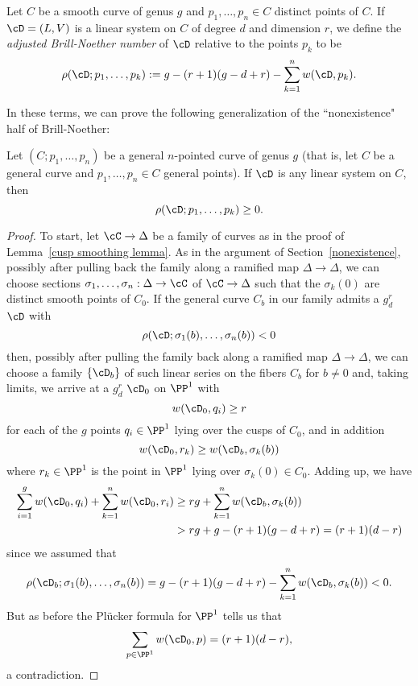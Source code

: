 \begin{definition}
Let $C$ be a smooth curve of genus $g$ and $p_1,\dots,p_n \in C$ distinct points of $C$. If $\cD = (L,V)$ is a linear system on $C$ of degree $d$ and dimension $r$, we define the \emph{adjusted Brill-Noether number} of $\cD$ relative to the points $p_k$ to be
$$
\rho(\cD; p_1,\dots,p_k) := g - (r+1)(g-d+r) - \sum_{k=1}^n w(\cD,p_k).
$$
\end{definition}

In these terms, we can prove the following generalization of the ``nonexistence" half of Brill-Noether:

\begin{theorem}\label{Brill-Noether with inflection}
Let $(C;p_1,\dots,p_n)$ be a general $n$-pointed curve of genus $g$ (that is, let $C$ be a general curve and $p_1,\dots,p_n \in C$ general points). If $\cD$ is any linear system on $C$, then
$$
\rho(\cD; p_1,\dots,p_k) \geq 0.
$$
\end{theorem}

\begin{proof}
To start, let $\cC \to \Delta$ be a family of curves as in the proof of Lemma~\ref{cusp smoothing lemma}.
As in the argument of Section~\ref{nonexistence}, possibly
after pulling back the family along a ramified map $\Delta \to \Delta$, we can choose sections $\sigma_1, \dots, \sigma_n : \Delta \to \cC$  of $\cC \to \Delta$ such that the $\sigma_k(0)$ are distinct smooth points of $C_0$.
If the general curve $C_b$ in our family admits a $g^r_d$ $\cD$ with
$$
\rho(\cD;\sigma_1(b),\dots,\sigma_n(b)) < 0
$$
then, possibly after pulling the family back along a ramified map $\Delta \to \Delta$, we can choose a family $\{\cD_b\}$ of such linear series 
on the fibers $C_b$ for $b \neq 0$ and, taking limits, we arrive at a $g^r_d$ $\cD_0$ on $\PP^1$ with
$$
w(\cD_0, q_i) \geq r
$$
for each of the $g$ points $q_i \in \PP^1$ lying over the cusps of $C_0$, and in addition
$$
w(\cD_0, r_k) \geq w(\cD_b,\sigma_k(b))
$$
where $r_k \in \PP^1$ is the point in $\PP^1$ lying over $\sigma_k(0) \in C_0$. Adding up, we have
\begin{align*}
\sum_{i=1}^g w(\cD_0, q_i) + \sum_{k=1}^n w(\cD_0, r_i) &\geq rg + \sum_{k=1}^n w(\cD_b,\sigma_k(b)) \\
&> rg + g - (r+1)(g-d+r) = (r+1)(d-r)
\end{align*}
since we assumed that 
$$
\rho(\cD_b;\sigma_1(b),\dots,\sigma_n(b)) = g - (r+1)(g-d+r) - \sum_{k=1}^n w(\cD_b,\sigma_k(b)) < 0.
$$
But as before the Pl\"ucker formula for $\PP^1$ tells us that
$$
\sum_{p \in \PP^1} w(\cD_0, p) = (r+1)(d-r),
$$
a contradiction.
\end{proof}

